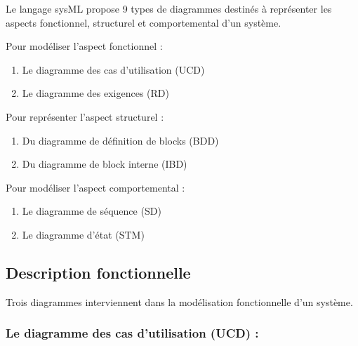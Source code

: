 \documentclass[12pt,a4paper]{report}
\begin{document}
\noindent \begin{flushleft}
	
	
	\noindent Le langage sysML propose 9 types de diagrammes destin\'{e}s \`{a} repr\'{e}senter les aspects fonctionnel, structurel et comportemental d'un syst\`{e}me. 
	
	\noindent Pour mod\'{e}liser l'aspect fonctionnel :
\end{flushleft}

\begin{enumerate}
	\item  Le diagramme des cas d'utilisation (UCD) 
	
	\item  Le diagramme des exigences (RD)
\end{enumerate}

\noindent \begin{flushleft}
	
	
	\noindent Pour repr\'{e}senter l'aspect structurel :
\end{flushleft}

\begin{enumerate}
	\item  Du diagramme de d\'{e}finition de blocks (BDD) 
	
	\item  Du diagramme de block interne (IBD)
\end{enumerate}

\noindent \begin{flushleft}
	Pour mod\'{e}liser l'aspect comportemental :
\end{flushleft}

\begin{enumerate}
	\item  Le diagramme de s\'{e}quence (SD) 
	
	\item  Le diagramme d'\'{e}tat (STM)
\end{enumerate}


\subsection{ Description fonctionnelle}

\noindent \begin{flushleft}
	Trois diagrammes interviennent dans la mod\'{e}lisation fonctionnelle d'un syst\`{e}me.
	
	\noindent 
\end{flushleft}


\subsubsection{ Le diagramme des cas d'utilisation (UCD) :}
\end{document}
